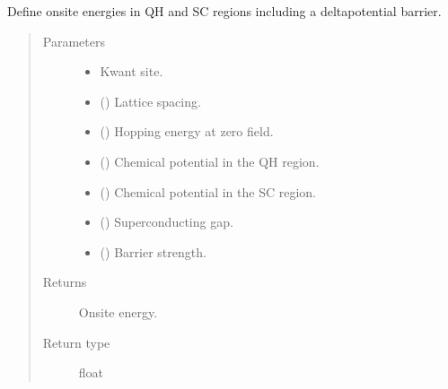\documentclass[letterpaper,10pt,english]{sphinxmanual}
\begin{document}
\begin{fulllineitems}
\label{\detokenize{modules:modules.functions.onsite}}
\pysigstartsignatures
{}
\pysigstopsignatures
\sphinxAtStartPar
Define onsite energies in QH and SC regions including a delta\sphinxhyphen{}potential barrier.
\begin{quote}\begin{description}
\item[{Parameters}] \leavevmode\begin{itemize}
\item {} 
\sphinxAtStartPar
{} \textendash{} Kwant site.

\item {} 
\sphinxAtStartPar
{} () \textendash{} Lattice spacing.

\item {} 
\sphinxAtStartPar
{} () \textendash{} Hopping energy at zero field.

\item {} 
\sphinxAtStartPar
{} () \textendash{} Chemical potential in the QH region.

\item {} 
\sphinxAtStartPar
{} () \textendash{} Chemical potential in the SC region.

\item {} 
\sphinxAtStartPar
{} () \textendash{} Superconducting gap.

\item {} 
\sphinxAtStartPar
{} () \textendash{} Barrier strength.

\end{itemize}

\item[{Returns}] \leavevmode
\sphinxAtStartPar
Onsite energy.

\item[{Return type}] \leavevmode
\sphinxAtStartPar
float

\end{description}\end{quote}

\end{fulllineitems}
\end{document}

